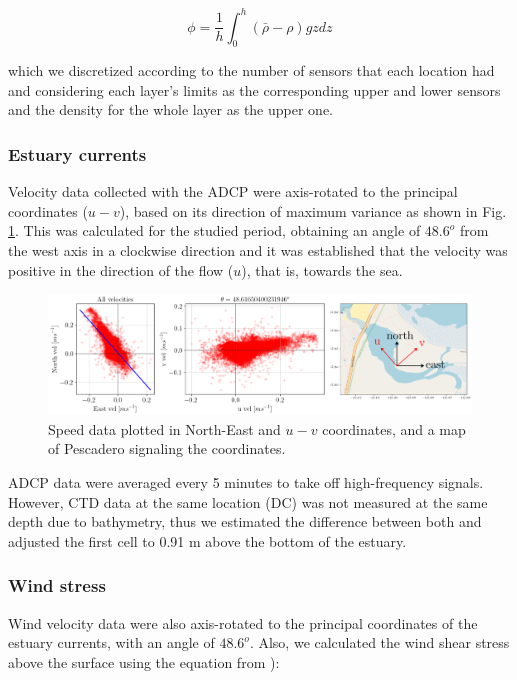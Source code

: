 \documentclass[tesis.tex]{subfiles}
\begin{document}
\begin{equation}
    \phi=\frac{1}{h}\int^h_0(\bar{\rho}-\rho)gzdz
    \label{eq: phi}
\end{equation}

which we discretized according to the number of sensors that each location had and considering each layer's limits as the corresponding upper and lower sensors and the density for the whole layer as the upper one. 

\subsubsection{Estuary currents}

Velocity data collected with the ADCP were axis-rotated to the principal coordinates ($u-v$), based on its direction of maximum variance as shown in Fig. \ref{fig:rotacion}. This was calculated for the studied period, obtaining an angle of $48.6^o$ from the west axis in a clockwise direction and it was established that the velocity was positive in the direction of the flow ($u$), that is, towards the sea.  \\

\begin{figure}[h!]
    \centering
    \includegraphics[width=\textwidth]{Imagenes/rotacion.png}
    \caption{Speed data plotted in North-East and $u-v$ coordinates, and a map of Pescadero signaling the coordinates.}
    \label{fig:rotacion}
\end{figure}

ADCP data were averaged every 5 minutes to take off high-frequency signals. However, CTD data at the same location (DC) was not measured at the same depth due to bathymetry, thus we estimated the difference between both and adjusted the first cell to 0.91 m above the bottom of the estuary. \\

\subsubsection{Wind stress}

Wind velocity data were also axis-rotated to the principal coordinates of the estuary currents, with an angle of $48.6^o$. Also, we calculated the wind shear stress above the surface using the equation from \cite{read2011derivation}): 
\end{document}
